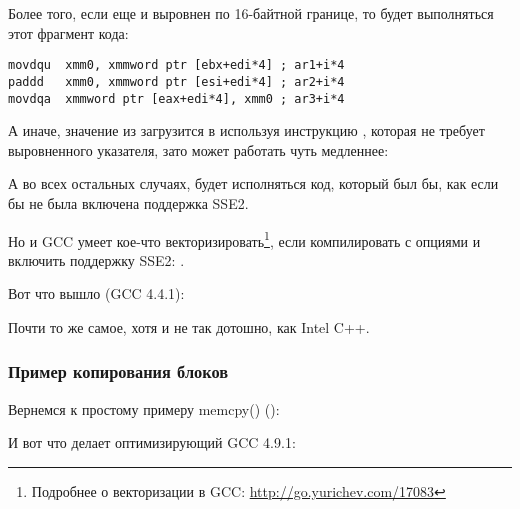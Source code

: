 Более того, если еще и  выровнен по 16-байтной границе, 
то будет выполняться этот фрагмент кода:

\begin{lstlisting}[style=customasmx86]
movdqu  xmm0, xmmword ptr [ebx+edi*4] ; ar1+i*4
paddd   xmm0, xmmword ptr [esi+edi*4] ; ar2+i*4
movdqa  xmmword ptr [eax+edi*4], xmm0 ; ar3+i*4
\end{lstlisting}

А иначе, значение из  загрузится в  используя инструкцию \MOVDQU, 
которая не требует выровненного указателя, зато может работать чуть медленнее:



А во всех остальных случаях, будет исполняться код, который был бы, как если бы не была 
включена поддержка SSE2.


\newcommand{\URLGCCVEC}{\url{http://go.yurichev.com/17083}}

Но и GCC умеет кое-что векторизировать\footnote{Подробнее о векторизации в GCC: \URLGCCVEC}, 
если компилировать с опциями \Othree и включить поддержку SSE2: .

Вот что вышло (GCC 4.4.1):



Почти то же самое, хотя и не так дотошно, как Intel C++.

\subsubsection{Пример копирования блоков}
\label{vec_memcpy}

Вернемся к простому примеру memcpy() ():



И вот что делает оптимизирующий GCC 4.9.1:



